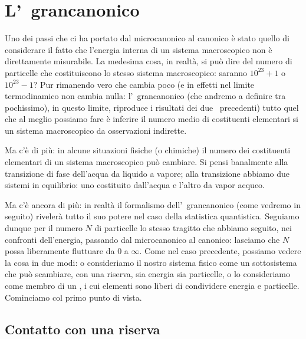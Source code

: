 \chapter{L'\ensemble\ grancanonico}
\label{cap:grancanonico}

Uno dei passi che ci ha portato dal microcanonico al canonico è stato quello di considerare il fatto che l'energia interna di un sistema macroscopico non è direttamente misurabile. La medesima cosa, in realtà, si può dire del numero di particelle che costituiscono lo stesso sistema macroscopico: saranno $10^{23} + 1$ o $10^{23} - 1$? Pur rimanendo vero che cambia poco (e in effetti nel limite termodinamico non cambia nulla: l'\ensemble\ grancanonico (che andremo a definire tra pochissimo), in questo limite, riproduce i risultati dei due \ensembles\ precedenti) tutto quel che al meglio possiamo fare è inferire il numero medio di costituenti elementari si un sistema macroscopico da osservazioni indirette.

Ma c'è di più: in alcune situazioni fisiche (o chimiche) il numero dei costituenti elementari di un sistema macroscopico può cambiare. Si pensi banalmente alla transizione di fase dell'acqua da liquido a vapore; alla transizione abbiamo due sistemi in equilibrio: uno costituito dall'acqua e l'altro da vapor acqueo.

Ma c'è ancora di più: in realtà il formalismo dell'\ensemble\ grancanonico (come vedremo in seguito) rivelerà tutto il suo potere nel caso della statistica quantistica. Seguiamo dunque per il numero $N$ di particelle lo stesso tragitto che abbiamo seguito, nei confronti dell'energia, passando dal microcanonico al canonico: lasciamo che $N$ possa liberamente fluttuare da $0$ a $\infty$. Come nel caso precedente, possiamo vedere la cosa in due modi: o consideriamo il nostro sistema fisico come un sottosistema che può scambiare, con una riserva, sia energia sia particelle, o lo consideriamo come membro di un \ensemble, i cui elementi sono liberi di condividere energia e particelle. Cominciamo col primo punto di vista.

\section{Contatto con una riserva}


